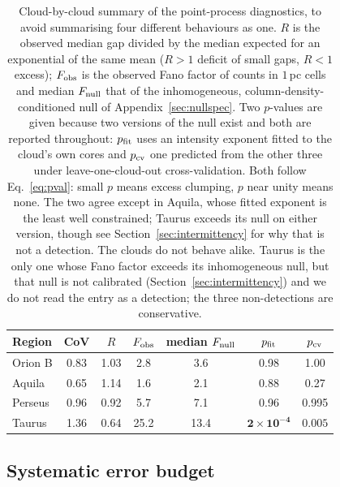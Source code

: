\documentclass[usenatbib,twoside,twocolumn]{mnras}
\begin{document}
\begin{table}
\caption{Cloud-by-cloud summary of the point-process diagnostics, to avoid summarising four different behaviours as one. $R$ is the observed median gap divided by the median expected for an exponential of the same mean ($R>1$ deficit of small gaps, $R<1$ excess); $F_{\rm obs}$ is the observed Fano factor of counts in $1$\,pc cells and median $F_{\rm null}$ that of the inhomogeneous, column-density-conditioned null of Appendix~\ref{sec:nullspec}. Two $p$-values are given because two versions of the null exist and both are reported throughout: $p_{\rm fit}$ uses an intensity exponent fitted to the cloud's own cores and $p_{\rm cv}$ one predicted from the other three under leave-one-cloud-out cross-validation. Both follow Eq.~\ref{eq:pval}: small $p$ means excess clumping, $p$ near unity means none. The two agree except in Aquila, whose fitted exponent is the least well constrained; Taurus exceeds its null on either version, though see Section~\ref{sec:intermittency} for why that is not a detection. The clouds do not behave alike. Taurus is the only one whose Fano factor exceeds its inhomogeneous null, but that null is not calibrated (Section~\ref{sec:intermittency}) and we do not read the entry as a detection; the three non-detections are conservative.}
\label{tab:percloud}
\footnotesize
\setlength{\tabcolsep}{3.5pt}
\begin{tabular}{lcccccc}
\toprule
Region & CoV & $R$ & $F_{\rm obs}$ & median $F_{\rm null}$ & $p_{\rm fit}$ & $p_{\rm cv}$ \\
\midrule
Orion B & 0.83 & 1.03 & 2.8  & 3.6  & 0.98 & 1.00 \\
Aquila  & 0.65 & 1.14 & 1.6  & 2.1  & 0.88 & 0.27 \\
Perseus & 0.96 & 0.92 & 5.7  & 7.1  & 0.96 & 0.995 \\
Taurus  & 1.36 & 0.64 & 25.2 & 13.4 & $\mathbf{2\times10^{-4}}$ & $\mathbf{0.005}$ \\
\bottomrule
\end{tabular}
\end{table}

\subsection{Systematic error budget}
\label{sec:error_budget}
\end{document}
